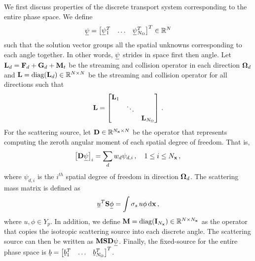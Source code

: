 \documentclass[../doc.tex]{subfiles}
\begin{document}
We first discuss properties of the discrete transport system corresponding to the entire phase space. We define 
	\begin{equation}
		\ubar{\psi} = \vector{\ubar{\psi}_1^T & \ldots & \ubar{\psi}_{N_\Omega}^T} \in \R^N 
	\end{equation}
such that the solution vector groups all the spatial unknowns corresponding to each angle together. In other words, $\ubar{\psi}$ strides in space first then angle. 
Let $\boldsymbol{\mathrm{L}}_d = \boldsymbol{\mathrm{F}}_d + \boldsymbol{\mathrm{G}}_d + \boldsymbol{\mathrm{M}}_t$ be the streaming and collision operator in each direction $\boldsymbol{\Omega}_d$ and $\boldsymbol{\mathrm{L}} = \operatorname{diag}(\boldsymbol{\mathrm{L}}_d) \in \mathbb{R}^{N\times N}$ be the streaming and collision operator for all directions such that 
	\begin{equation}
		\boldsymbol{\mathrm{L}} = \begin{bmatrix} 
			\boldsymbol{\mathrm{L}}_1 \\ 
			& \ddots \\
			&& \boldsymbol{\mathrm{L}}_{N_\Omega}
		\end{bmatrix} \,. 
	\end{equation}
For the scattering source, let $\boldsymbol{\mathrm{D}} \in \mathbb{R}^{N_{\boldsymbol{\mathrm{x}}} \times N}$ be the operator that represents computing the zeroth angular moment of each spatial degree of freedom. That is, 
	\begin{equation}
		\bracket{\mat{D}\ubar{\psi}}_i = \sum_d w_d \psi_{d,i} \,, \quad 1 \leq i\leq N_{\x} \,,
	\end{equation}
where $\psi_{d,i}$ is the $i^{th}$ spatial degree of freedom in direction $\boldsymbol{\Omega}_d$. The scattering mass matrix is defined as 
	\begin{equation}
		\ubar{u}^T \mat{S} \ubar{\phi} = \int \sigma_s\, u\phi \ud \x \,, 
	\end{equation}
where $u,\phi \in Y_p$. In addition, we define $\boldsymbol{\mathrm{M}} = \operatorname{diag}(\boldsymbol{\mathrm{I}}_{N_{\boldsymbol{\mathrm{x}}}})\in \mathbb{R}^{N \times N_{\boldsymbol{\mathrm{x}}}}$ as the operator that copies the isotropic scattering source into each discrete angle. The scattering source can then be written as $\mat{M}\mat{S}\mat{D} \ubar{\psi}$. Finally, the fixed-source for the entire phase space is $\ubar{b} = \vector{\ubar{b}_1^T & \ldots & \ubar{b}_{N_\Omega}^T}$. 
\end{document}

